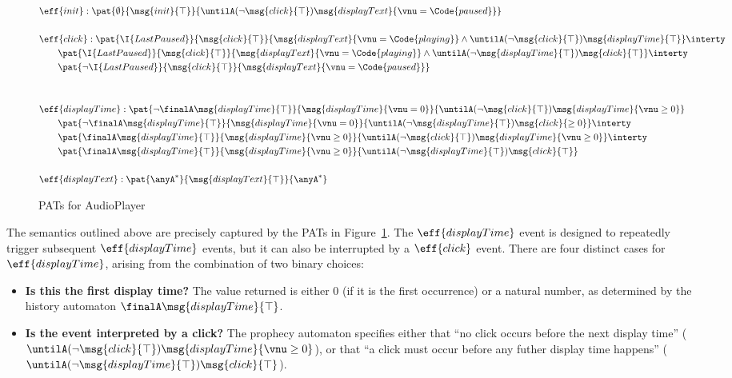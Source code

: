 \begin{figure}[h!]
    \centering
    {\small\begin{align*}
        &\eff{init}: \pat{\emptyset}{\msg{init}{\top}}{\untilA (\neg\msg{click}{\top}) \msg{displayText}{\vnu = \Code{paused}}}
        \\ \\
        &\eff{click}: \pat{\I{LastPaused}}{\msg{click}{\top}}{\msg{displayText}{\vnu = \Code{playing}} \land \untilA (\neg\msg{click}{\top}) \msg{displayTime}{\top}} \interty\\
        &\qquad \pat{\I{LastPaused}}{\msg{click}{\top}}{\msg{displayText}{\vnu = \Code{playing}} \land \untilA (\neg\msg{displayTime}{\top}) \msg{click}{\top}} \interty\\
        &\qquad \pat{\neg\I{LastPaused}}{\msg{click}{\top}}{\msg{displayText}{\vnu = \Code{paused}}}\\
        \\ \\
        &\eff{displayTime}: \pat{\neg\finalA\msg{displayTime}{\top}}{\msg{displayTime}{\vnu = 0}}{\untilA (\neg\msg{click}{\top}) \msg{displayTime}{\vnu \geq 0}} \\
        &\qquad \pat{\neg\finalA\msg{displayTime}{\top}}{\msg{displayTime}{\vnu = 0}}{\untilA (\neg\msg{displayTime}{\top}) \msg{click}{\geq 0}} \interty\\
        &\qquad \pat{\finalA\msg{displayTime}{\top}}{\msg{displayTime}{\vnu \geq 0}}{\untilA (\neg\msg{click}{\top}) \msg{displayTime}{\vnu \geq 0}} \interty\\
        &\qquad \pat{\finalA\msg{displayTime}{\top}}{\msg{displayTime}{\vnu \geq 0}}{\untilA (\neg\msg{displayTime}{\top}) \msg{click}{\top}}
        \\ \\
        &\eff{displayText}: \pat{\anyA^*}{\msg{displayText}{\top}}{\anyA^*}
    \end{align*}}
    \caption{PATs for AudioPlayer}
    \label{fig:audio-player-pat}
\end{figure}

The semantics outlined above are precisely captured by the PATs in Figure~\ref{fig:audio-player-pat}. The $\eff{displayTime}$ event is designed to repeatedly trigger subsequent $\eff{displayTime}$ events, but it can also be interrupted by a $\eff{click}$ event. There are four distinct cases for $\eff{displayTime}$, arising from the combination of two binary choices:
\begin{itemize}
    \item \textbf{Is this the first display time?} The value returned is either $0$ (if it is the first occurrence) or a natural number, as determined by the history automaton $\finalA\msg{displayTime}{\top}$.
    \item \textbf{Is the event interpreted by a click?} The prophecy automaton specifies either that ``no click occurs before the next display time'' ($\untilA (\neg\msg{click}{\top}) \msg{displayTime}{\vnu \geq 0}$), or that ``a click must occur before any futher display time happens'' ($\untilA (\neg\msg{displayTime}{\top}) \msg{click}{\top}$).
\end{itemize}


